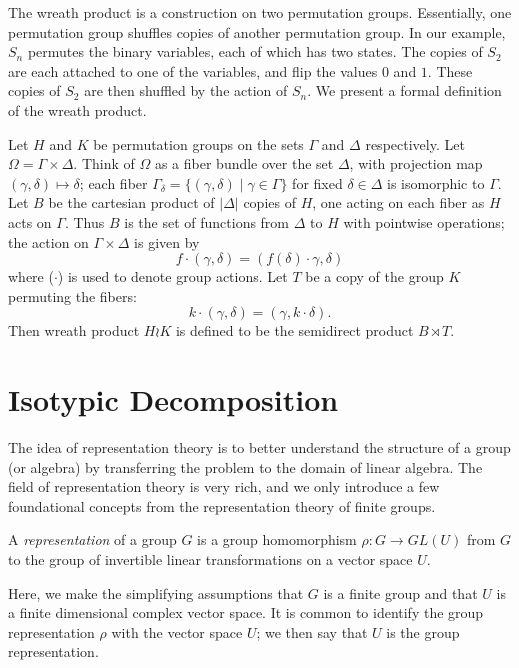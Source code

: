 \documentclass[cclicense]{hmcthesis}
\numberwithin{equation}{chapter}
\numberwithin{thmcounter}{chapter}
\begin{document}
    The wreath product is a construction on two permutation groups.
    Essentially, one permutation group shuffles copies of another permutation
    group.  In our example, $S_n$ permutes the binary variables, each of which
    has two states.  The copies of $S_2$ are each attached to one of the
    variables, and flip the values $0$ and $1$.  These copies of $S_2$ are then
    shuffled by the action of $S_n$.  We present a formal definition of the
    wreath product.
    \begin{definition}
        Let $H$ and $K$ be permutation groups on the sets $\Gamma$ and $\Delta$
        respectively.  Let $\Omega = \Gamma \times \Delta$.  Think of $\Omega$
        as a fiber bundle over the set $\Delta$, with projection map $(\gamma,
        \delta) \mapsto \delta$; each fiber \mbox{$\Gamma_\delta = \{(\gamma, \delta)
        \mid \gamma \in \Gamma\}$} for fixed $\delta \in \Delta$ is isomorphic to
        $\Gamma$.  Let $B$ be the cartesian product of $|\Delta|$ copies of $H$,
        one acting on each fiber as $H$ acts on $\Gamma$.  Thus $B$ is the set
        of functions from $\Delta$ to $H$ with pointwise operations; the action
        on $\Gamma \times \Delta$ is given by
        \[
            f\cdot(\gamma, \delta) = (f(\delta) \cdot \gamma, \delta)
        \]
        where ($\cdot$) is used to denote group actions.  Let $T$ be a copy of
        the group $K$ permuting the fibers:
        \[
            k \cdot (\gamma, \delta) = (\gamma, k \cdot \delta).
        \]
        Then wreath product $H \wr K$ is defined to be the semidirect product $B
        \rtimes T$.
    \end{definition}

\section{Isotypic Decomposition}
    
    The idea of representation theory is to better understand the structure of a
    group (or algebra) by transferring the problem to the domain of linear
    algebra.  The field of representation theory is very rich, and we only
    introduce a few foundational concepts from the representation theory of
    finite groups.

    \begin{definition}
        A \emph{representation} of a group $G$ is a group homomorphism $\rho: G
        \to GL(U)$ from $G$ to the group of invertible linear transformations on
        a vector space $U$.  
    \end{definition}
    Here, we make the simplifying assumptions that $G$ is a finite group and
    that $U$ is a finite dimensional complex vector space.  It is common to
    identify the group representation $\rho$ with the vector space $U$; we then
    say that $U$ is the group representation.
\end{document}
